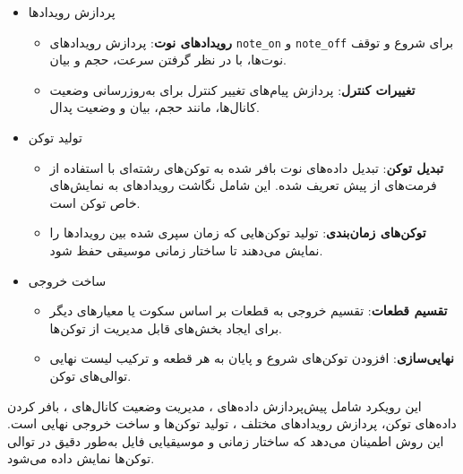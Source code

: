 \begin{itemize}
      \item {پردازش رویدادها}

            \begin{itemize}

                  \item
                        \textbf{رویدادهای نوت}: پردازش رویدادهای \texttt{note\_on} و
                        \texttt{note\_off} برای شروع و توقف نوت‌ها، با در نظر گرفتن سرعت، حجم و
                        بیان.
                  \item
                        \textbf{تغییرات کنترل}: پردازش پیام‌های تغییر کنترل برای به‌روزرسانی
                        وضعیت کانال‌ها، مانند حجم، بیان و وضعیت پدال.
            \end{itemize}

      \item    {تولید توکن}

            \begin{itemize}

                  \item
                        \textbf{تبدیل توکن}: تبدیل داده‌های نوت بافر شده به توکن‌های رشته‌ای با
                        استفاده از فرمت‌های از پیش تعریف شده. این شامل نگاشت رویدادهای  به
                        نمایش‌های خاص توکن است.
                  \item
                        \textbf{توکن‌های زمان‌بندی}: تولید توکن‌هایی که زمان سپری شده بین
                        رویدادها را نمایش می‌دهند تا ساختار زمانی موسیقی حفظ شود.
            \end{itemize}

      \item{ساخت خروجی}

            \begin{itemize}

                  \item
                        \textbf{تقسیم قطعات}: تقسیم خروجی به قطعات بر اساس سکوت یا معیارهای
                        دیگر برای ایجاد بخش‌های قابل مدیریت از توکن‌ها.
                  \item
                        \textbf{نهایی‌سازی}: افزودن توکن‌های شروع و پایان به هر قطعه و ترکیب
                        لیست نهایی توالی‌های توکن.
            \end{itemize}

\end{itemize}

این رویکرد شامل پیش‌پردازش داده‌های ، مدیریت وضعیت کانال‌های ، بافر
کردن داده‌های توکن، پردازش رویدادهای مختلف ، تولید توکن‌ها و ساخت
خروجی نهایی است. این روش اطمینان می‌دهد که ساختار زمانی و موسیقیایی فایل
 به‌طور دقیق در توالی توکن‌ها نمایش داده می‌شود.


